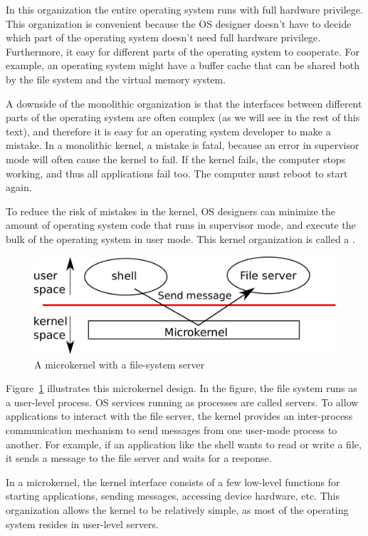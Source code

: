 In this organization the entire operating system runs with full hardware
privilege. This organization is convenient because the OS designer doesn't have
to decide which part of the operating system doesn't need full hardware
privilege.  Furthermore, it easy for different parts of the operating system to
cooperate.  For example, an operating system might have a buffer cache that can
be shared both by the file system and the virtual memory system. 

A downside of the monolithic organization is that the interfaces between
different parts of the operating system are often complex (as we will see in the
rest of this text), and therefore it is easy for an operating system developer
to make a mistake.  In a monolithic kernel, a mistake is fatal, because an error
in supervisor mode will often cause the kernel to fail.  If the kernel fails,
the computer stops working, and thus all applications fail too.  The computer
must reboot to start again.

To reduce the risk of mistakes in the kernel, OS designers can minimize the
amount of operating system code that runs in supervisor mode, and execute the
bulk of the operating system in user mode.
This kernel organization is called a
.

\begin{figure}[t]
\center
\includegraphics[scale=0.5]{fig/mkernel.pdf}
\caption{A microkernel with a file-system server}
\label{fig:mkernel}
\end{figure}

Figure~\ref{fig:mkernel}
illustrates this microkernel design.  In the figure, the file system runs as a
user-level process.  OS services running as processes are called servers.
To allow applications to interact with the
file server, the kernel provides an inter-process communication
mechanism to send messages from one
user-mode process to another.  For example, if an application like the shell
wants to read or write a file, it sends a message to the file server and waits
for a response. 

In a microkernel, the kernel interface consists of a few low-level
functions for starting applications, sending messages,
accessing device hardware, etc.  This organization allows the kernel to be 
relatively simple, as most of the operating system
resides in user-level servers.

